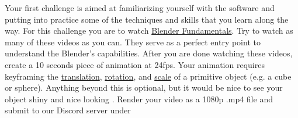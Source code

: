 \begin{itemize}[noitemsep,topsep=0pt,leftmargin=*]
            \newline Your first challenge is aimed at familiarizing yourself with the software and putting into practice some of the techniques and skills that you learn along the way. For this challenge you are to watch \href{https://www.youtube.com/playlist?list=PLa1F2ddGya_-UvuAqHAksYnB0qL9yWDO6}{Blender Fundamentals}. Try to watch as many of these videos as you can. They serve as a perfect entry point to understand the Blender's capabilities. After you are done watching these videos, create a 10 seconds piece of animation at 24fps. Your animation requires keyframing the \ul{translation}, \ul{rotation}, and \ul{scale} of a primitive object (e.g. a cube or sphere). Anything beyond this is optional, but it would be nice to see your object shiny and nice looking . Render your video as a 1080p .mp4 file and submit to our Discord server under \discordC
\end{itemize}